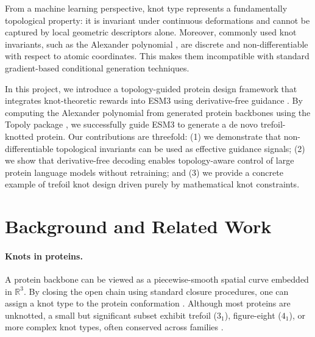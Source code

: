\documentclass{article}
\begin{document}
From a machine learning perspective, knot type represents a fundamentally topological property: it is invariant under continuous deformations and cannot be captured by local geometric descriptors alone.
Moreover, commonly used knot invariants, such as the Alexander polynomial \cite{Alexander1928}, are discrete and non-differentiable with respect to atomic coordinates.
This makes them incompatible with standard gradient-based conditional generation techniques.

In this project, we introduce a topology-guided protein design framework that integrates knot-theoretic rewards into ESM3 using derivative-free guidance \cite{Li2024}.
By computing the Alexander polynomial from generated protein backbones using the Topoly package \cite{Dabrowski-Tumanski2021}, we successfully guide ESM3 to generate a de novo trefoil-knotted protein.
Our contributions are threefold:
(1) we demonstrate that non-differentiable topological invariants can be used as effective guidance signals;
(2) we show that derivative-free decoding enables topology-aware control of large protein language models without retraining; and
(3) we provide a concrete example of trefoil knot design driven purely by mathematical knot constraints.

\section{Background and Related Work}

\paragraph{Knots in proteins.}
A protein backbone can be viewed as a piecewise-smooth spatial curve embedded in $\mathbb{R}^3$.
By closing the open chain using standard closure procedures, one can assign a knot type to the protein conformation \cite{Faisca2015}.
Although most proteins are unknotted, a small but significant subset exhibit trefoil ($3_1$), figure-eight ($4_1$), or more complex knot types, often conserved across families \cite{Sukowska2012,Dabrowski-Tumanski2019}.
\end{document}
